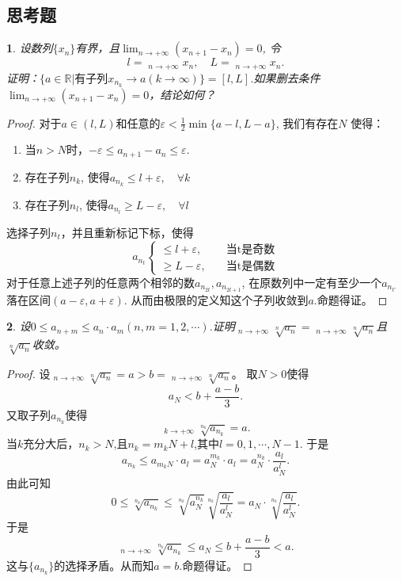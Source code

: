 \documentclass[utf8]{book}
\newtheorem{example}{}[section]             %
\DeclareMathOperator*\lowlim{\underline{lim}}
\DeclareMathOperator*\uplim{\overline{lim}}
\begin{document}
\subsection{思考题}
\begin{example}
设数列$\{x_n\}$有界，且$\displaystyle\lim_{n\to +\infty}(x_{n+1}-x_n) = 0$, 令
$$l=\displaystyle\lowlim_{n\to +\infty}x_n, \quad L=\displaystyle\uplim_{n\to +\infty}x_n.$$
证明：$\{a\in\mathbb{R} | \text{有子列}x_{n_k}\rightarrow a(k\rightarrow \infty)\}=[l,L]$.如果删去条件$\displaystyle\lim_{n\to +\infty}(x_{n+1}-x_n) = 0$，结论如何？
\end{example}
\begin{proof}
对于$a\in (l, L)$和任意的$\varepsilon < \frac{1}{2}\min\{a-l, L-a\}$, 我们有存在$N$
使得：
\renewcommand\labelenumi{\normalfont(\theenumi)}
\begin{enumerate}
\item 当$n>N$时，$-\varepsilon \leq a_{n+1} - a_n \leq \varepsilon$.
\item 存在子列$n_{k}$, 使得$a_{n_k} \leq l +\varepsilon, \quad\forall k$
\item 存在子列$n_{l}$, 使得$a_{n_l}\geq L -\varepsilon,\quad\forall l$
\end{enumerate}
选择子列$n_{t}$，并且重新标记下标，使得
\begin{equation*}
a_{n_{t}}
\begin{cases} 
\leq l + \varepsilon, &\quad \text{当t是奇数}\\
\geq L -\varepsilon, &\quad \text{当t是偶数}
\end{cases}
\end{equation*}
对于任意上述子列的任意两个相邻的数$a_{n_{2t}}, a_{n_{2t+1}}$, 在原数列中一定有至少一个$a_{n_{t'}}$落在区间$(a-\varepsilon, a+\varepsilon)$. 从而由极限的定义知这个子列收敛到$a$.命题得证。
\end{proof}
\begin{example}
设$0\leq a_{n+m}\leq a_n\cdot a_m(n,m=1,2,\cdots)$.证明$\displaystyle\uplim_{n\to +\infty}\sqrt[n]{a_n} = \displaystyle\lowlim_{n\to +\infty}\sqrt[n]{a_n}$且$\sqrt[n]{a_n}$收敛。
\end{example}
\begin{proof}
设$\displaystyle\uplim_{n\to +\infty}\sqrt[n]{a_n} 
=a > b=\displaystyle\lowlim_{n\to +\infty}\sqrt[n]{a_n}$。
取$N > 0$使得 $$a_N < b +\frac{a-b}{3}.$$
又取子列$a_{n_k}$使得
$$\displaystyle\uplim_{k\to +\infty}\sqrt[n_{k}]{a_{n_k}} = a.$$
当$k$充分大后，$n_k > N$,且$n_k = m_kN + l$,其中$l = 0, 1, \cdots, N - 1$.
于是$$a_{n_k} \leq a_{m_kN}\cdot a_l = a_N^{m_k}\cdot a_l = a_N^{n_k}\cdot \frac{a_l}{a_N^{l}}.$$
由此可知
$$0 \leq \sqrt[n_k]{a_{n_k}}\leq \sqrt[n_k]{a_N^{n_k}}\sqrt[n_k]{\frac{a_l}{a_N^{l}}}= a_N\cdot\sqrt[n_k]{\frac{a_l}{a_N^{l}}}.$$
于是
$$\displaystyle\uplim_{n\to +\infty}\sqrt[n_k]{a_{n_k}} \leq a_N \leq b+\frac{a-b}{3} < a.$$
这与$\{a_{n_k}\}$的选择矛盾。从而知$a=b$.命题得证。
\end{proof}
\end{document}
